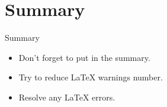 \section{Summary}
\begin{frame}{Summary}
    \begin{itemize}
        \item Don't forget to put in the summary.
        \item Try to reduce LaTeX warnings number.
        \item Resolve any LaTeX errors.
    \end{itemize}
\end{frame}